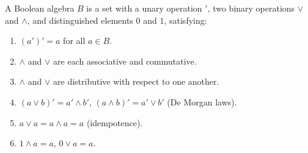 A Boolean algebra $B$ is a set with a unary operation $'$, two binary operations $\lor$ and $\land$, and distinguished elements $0$ and $1$, satisfying:
\begin{enumerate}
\item[(a)] $(a')' = a$ for all $a \in B$.
\item[(b)] $\land$ and $\lor$ are each associative and commutative.
\item[(c)] $\land$ and $\lor$ are distributive with respect to one another.
\item[(d)] $(a \lor b)' = a' \land b'$, $(a \land b)' = a' \lor b'$ (De Morgan laws).
\item[(e)] $a \lor a = a \land a = a$ (idempotence).
\item[(f)] $1 \land a = a$, $0 \lor a = a$.
\end{enumerate}
